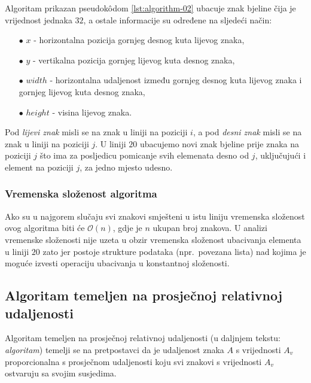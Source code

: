 \documentclass[times, utf8, zavrsni]{fer}
\begin{document}
Algoritam prikazan pseudokôdom \ref{lst:algorithm-02} ubacuje znak bjeline
čija je vrijednost jednaka $32$, a ostale informacije su određene na sljedeći
način:
\begin{itemize}
    \item[$\bullet$] $x$ - horizontalna pozicija gornjeg desnog kuta lijevog
                           znaka,
    \item[$\bullet$] $y$ - vertikalna pozicija gornjeg lijevog kuta desnog
                           znaka,
    \item[$\bullet$] $width$ - horizontalna udaljenost između gornjeg desnog
                               kuta lijevog znaka i gornjeg lijevog kuta desnog
                               znaka,
    \item[$\bullet$] $height$ - visina lijevog znaka.
\end{itemize}

Pod \emph{lijevi znak} misli se na znak u liniji na poziciji $i$, a pod
\emph{desni znak} misli se na znak u liniji na poziciji $j$. U liniji $20$
ubacujemo novi znak bjeline prije znaka na poziciji $j$ što
ima za posljedicu pomicanje svih elemenata desno od $j$, uključujući i element
na poziciji $j$, za jedno mjesto udesno.


\subsubsection{Vremenska složenost algoritma}
Ako su u najgorem slučaju svi znakovi smješteni u istu liniju vremenska
složenost ovog algoritma biti će $\mathcal{O}(n)$, gdje je $n$ ukupan broj
znakova. U analizi vremenske složenosti nije uzeta u obzir vremenska složenost
ubacivanja elementa u liniji $20$ zato jer postoje
strukture podataka (npr.\ povezana lista) nad kojima je moguće izvesti operaciju
ubacivanja u konstantnoj složenosti.








\subsection{Algoritam temeljen na prosječnoj relativnoj udaljenosti}
\label{subsec:algoritam-temeljen-na-prosjecnoj-relativnoj-udaljenosti}
Algoritam temeljen na prosječnoj relativnoj udaljenosti (u daljnjem tekstu:
\emph{algoritam}) temelji se na pretpostavci da je udaljenost znaka $A$ s
vrijednosti  $A_v$ proporcionalna s prosječnom udaljenosti koju svi
znakovi s vrijednosti $A_v$ ostvaruju sa svojim susjedima.
\end{document}
